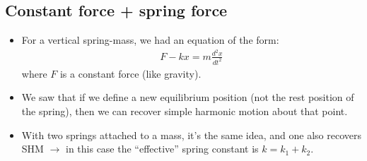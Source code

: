 \documentclass[aspectratio=169,
hyperref={colorlinks,urlcolor=blue}
]{beamer}
\begin{document}
\subsection{Constant force + spring force}
\label{subsec:cnsthforceplusspringforce}
{
\begin{itemize}
\item For a vertical spring-mass, we had an equation of the form:
\begin{align*}
F-kx=m\frac{d^2x}{dt^2}
\end{align*}
where $F$ is a constant force (like gravity).
\item We saw that if we define a new equilibrium position (not the rest position of the spring), then we can recover simple harmonic motion about that point. 
\item With two springs attached to a mass, it's the same idea, and one also recovers SHM $\rightarrow$ in this case the ``effective'' spring constant is $k=k_1+k_2$.
\end{itemize}
}
\end{document}
